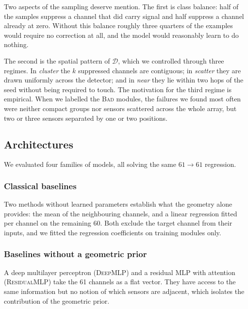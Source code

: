\documentclass[10pt,conference]{IEEEtran}
\begin{document}
Two aspects of the sampling deserve mention. The first is class balance: half
of the samples suppress a channel that did carry signal and half suppress a
channel already at zero. Without this balance roughly three quarters of the
examples would require no correction at all, and the model would reasonably
learn to do nothing.

The second is the spatial pattern of $\mathcal{D}$, which we controlled through
three regimes. In \emph{cluster} the $k$ suppressed channels are contiguous; in
\emph{scatter} they are drawn uniformly across the detector; and in \emph{near}
they lie within two hops of the seed without being required to touch. The
motivation for the third regime is empirical. When we labelled the \textsc{Bad}
modules, the failures we found most often were neither compact groups nor
sensors scattered across the whole array, but two or three sensors separated by
one or two positions.

\subsection{Architectures}
\label{sec:architectures}

We evaluated four families of models, all solving the same $61 \rightarrow 61$
regression.

\subsubsection{Classical baselines}
Two methods without learned parameters establish what the geometry alone
provides: the mean of the neighbouring channels, and a linear regression fitted
per channel on the remaining 60. Both exclude the target channel from their
inputs, and we fitted the regression coefficients on training modules only.

\subsubsection{Baselines without a geometric prior}
A deep multilayer perceptron (\textsc{DeepMLP}) and a residual MLP with
attention (\textsc{ResidualMLP}) take the 61 channels as a flat vector. They
have access to the same information but no notion of which sensors are adjacent,
which isolates the contribution of the geometric prior.
\end{document}
